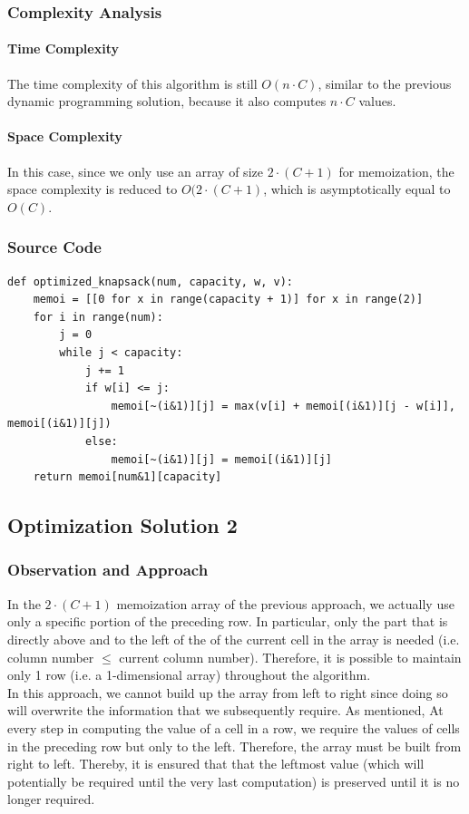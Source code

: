\documentclass{article}
\begin{document}
\pagebreak

\subsubsection{Complexity Analysis}
\paragraph{Time Complexity} The time complexity of this algorithm is still $O(n\cdot C)$, similar to the previous dynamic programming solution, because it also computes $n\cdot C$ values. 
\paragraph{Space Complexity} In this case, since we only use an array of size $2 \cdot (C+1)$ for memoization, the space complexity is reduced to $O(2 \cdot (C+1)$, which is asymptotically equal to $O(C)$.

\subsubsection{Source Code}
\begin{lstlisting}[breaklines=true]
def optimized_knapsack(num, capacity, w, v):  
    memoi = [[0 for x in range(capacity + 1)] for x in range(2)]
    for i in range(num): 
        j = 0   
        while j < capacity:
            j += 1
            if w[i] <= j:
                memoi[~(i&1)][j] = max(v[i] + memoi[(i&1)][j - w[i]], memoi[(i&1)][j]) 
            else: 
                memoi[~(i&1)][j] = memoi[(i&1)][j] 
    return memoi[num&1][capacity]
\end{lstlisting}

\subsection{Optimization Solution 2}
\subsubsection{Observation and Approach}
In the $2 \cdot (C+1)$ memoization array of the previous approach, we actually use only a specific portion of the preceding row. In particular, only the part that is directly above and to the left of the of the current cell in the array is needed (i.e. column number $\leq$ current column number). Therefore, it is possible to maintain only 1 row (i.e. a 1-dimensional array) throughout the algorithm. \\
\indent In this approach, we cannot build up the array from left to right since doing so will overwrite the information that we subsequently require. As mentioned, At every step in computing the value of a cell in a row, we require the values of cells in the preceding row but only to the left. Therefore, the array must be built from right to left. Thereby, it is ensured that that the leftmost value (which will potentially be required until the very last computation) is preserved until it is no longer required.
\end{document}
